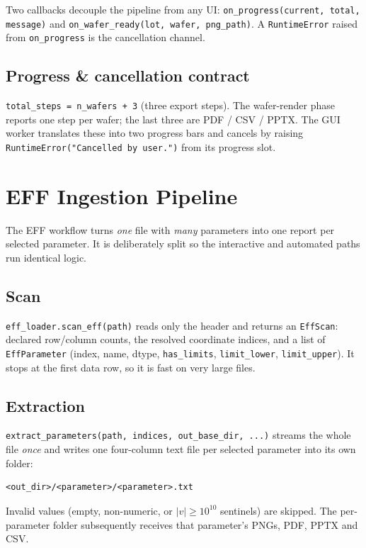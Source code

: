\documentclass[11pt,a4paper]{report}
\newcommand{\code}[1]{\texttt{#1}}
\begin{document}
Two callbacks decouple the pipeline from any UI: \code{on\_progress(current,
total, message)} and \code{on\_wafer\_ready(lot, wafer, png\_path)}. A
\code{RuntimeError} raised from \code{on\_progress} is the cancellation channel.

\section{Progress \& cancellation contract}
\code{total\_steps = n\_wafers + 3} (three export steps). The wafer-render phase
reports one step per wafer; the last three are PDF / CSV / PPTX. The GUI worker
translates these into two progress bars and cancels by raising
\code{RuntimeError("Cancelled by user.")} from its progress slot.

\chapter{EFF Ingestion Pipeline}\label{ch:eff}

The EFF workflow turns \emph{one} file with \emph{many} parameters into one
report per selected parameter. It is deliberately split so the interactive and
automated paths run identical logic.

\section{Scan}
\code{eff\_loader.scan\_eff(path)} reads only the header and returns an
\code{EffScan}: declared row/column counts, the resolved coordinate indices, and
a list of \code{EffParameter} (index, name, dtype, \code{has\_limits},
\code{limit\_lower}, \code{limit\_upper}). It stops at the first data row, so it
is fast on very large files.

\section{Extraction}
\code{extract\_parameters(path, indices, out\_base\_dir, ...)} streams the whole
file \emph{once} and writes one four-column text file per selected parameter into
its own folder:
\begin{lstlisting}[style=plain]
<out_dir>/<parameter>/<parameter>.txt
\end{lstlisting}
Invalid values (empty, non-numeric, or $|v|\ge 10^{10}$ sentinels) are skipped.
The per-parameter folder subsequently receives that parameter's PNGs, PDF, PPTX
and CSV.
\end{document}
